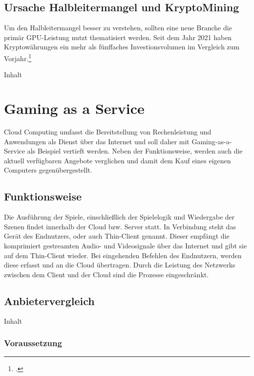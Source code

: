 \documentclass[12pt,toc=bib,toc=listof]{scrreprt}
\begin{document}
\section{Ursache Halbleitermangel und KryptoMining}
\label{sec:Ursache Halbleitermangel und KryptoMining}

Um den Halbleitermangel besser zu verstehen, sollten eine neue Branche die primär GPU-Leistung 
nutzt thematisiert werden. Seit dem Jahr 2021 haben Kryptowährungen ein mehr als fünffaches Investionsvolumen
im Vergleich zum Vorjahr.\footcite [] [] {Statista_Research_1}

Inhalt

\chapter{Gaming as a Service}
\label{sec: Gaming as a Service}

Cloud Computing umfasst die Bereitstellung von Rechenleistung und Anwendungen als Dienst über das Internet und soll daher mit Gaming-as-a-Service als Beispiel vertieft werden. Neben der Funktionsweise, werden auch die aktuell verfügbaren Angebote verglichen und damit dem Kauf eines eigenen Computers gegenübergestellt.

\section{Funktionsweise}
\label{sec:Funktionsweise}

Die Ausführung der Spiele, einschließlich der Spielelogik und Wiedergabe der Szenen findet innerhalb der Cloud bzw. Server statt. In Verbindung steht das Gerät des Endnutzers, oder auch Thin-Client genannt. Dieser empfängt die komprimiert gestreamten Audio- und Videosignale über das Internet und gibt sie auf dem Thin-Client wieder. Bei eingehenden Befehlen des Endnutzern, werden diese erfasst und an die Cloud übertragen. Durch die Leistung des Netzwerks zwischen dem Client und der Cloud sind die Prozesse eingeschränkt.

\section{Anbietervergleich}
\label{sec:Anbietervergleich}

Inhalt

\subsection{Voraussetzung}
\label{sec:Vorraussetzung}
\end{document}
